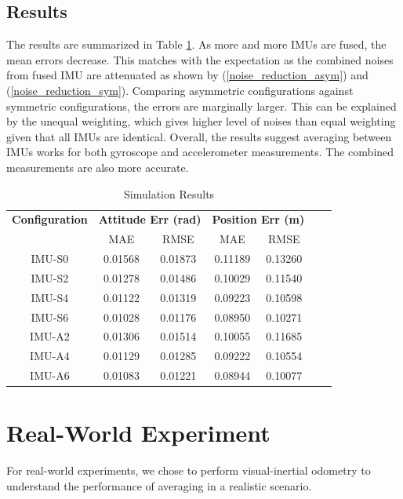 \documentclass[conference]{IEEEtran}
\begin{document}
\subsection{Results}

The results are summarized in Table \ref{tab:sim_result}. As more and more IMUs are fused, the mean errors decrease. This matches with the expectation as the combined noises from fused IMU are attenuated as shown by (\ref{noise_reduction_asym}) and (\ref{noise_reduction_sym}). Comparing asymmetric configurations against symmetric configurations, the errors are marginally larger. This can be explained by the unequal weighting, which gives higher level of noises than equal weighting given that all IMUs are identical. Overall, the results suggest averaging between IMUs works for both gyroscope and accelerometer measurements. The combined measurements are also more accurate.

\begin{table}[h!]
\centering
\caption{Simulation Results}
\label{tab:sim_result}
\begin{tabular}{ccccccc}
\toprule
\textbf{Configuration} & \multicolumn{2}{c}{\textbf{Attitude Err (rad)}} & \multicolumn{2}{c}{\textbf{Position Err (m)}} \\
\cmidrule(lr){2-3} \cmidrule(lr){4-5}
& MAE & RMSE & MAE & RMSE \\
\midrule
IMU-S0 & 0.01568 & 0.01873 & 0.11189 & 0.13260 \\
\midrule
IMU-S2 & 0.01278 & 0.01486 & 0.10029 & 0.11540 \\
IMU-S4 & 0.01122 & 0.01319 & 0.09223 & 0.10598 \\
IMU-S6 & 0.01028 & 0.01176 & 0.08950  & 0.10271 \\
\midrule
IMU-A2 & 0.01306 & 0.01514 & 0.10055 & 0.11685 \\
IMU-A4 & 0.01129 & 0.01285 & 0.09222 & 0.10554 \\
IMU-A6 & 0.01083 & 0.01221 & 0.08944 & 0.10077 \\
\bottomrule
\end{tabular}
\end{table}

\section{Real-World Experiment}

For real-world experiments, we chose to perform visual-inertial odometry to understand the performance of averaging in a realistic scenario.
\end{document}

